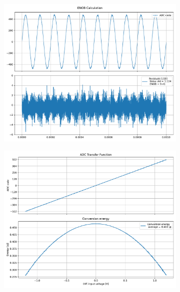 \documentclass[varwidth]{standalone}
\begin{document}
\begin{figure}
\begin{subfigure}{0.32\textwidth}
    \includegraphics[width=\textwidth]{behavioral_10b_noisy_scadec_enob.pdf}
\end{subfigure}
\begin{subfigure}{0.32\textwidth}
    \begin{table}
    \let\center\empty
    \let\endcenter\relax
    \centering
    \resizebox{0.3\width}{!}{}
    \end{table}
    \includegraphics[width=\textwidth]{behavioral_10b_noisy_scadec_energy.pdf}
\end{subfigure}
\end{figure}
\end{document}
